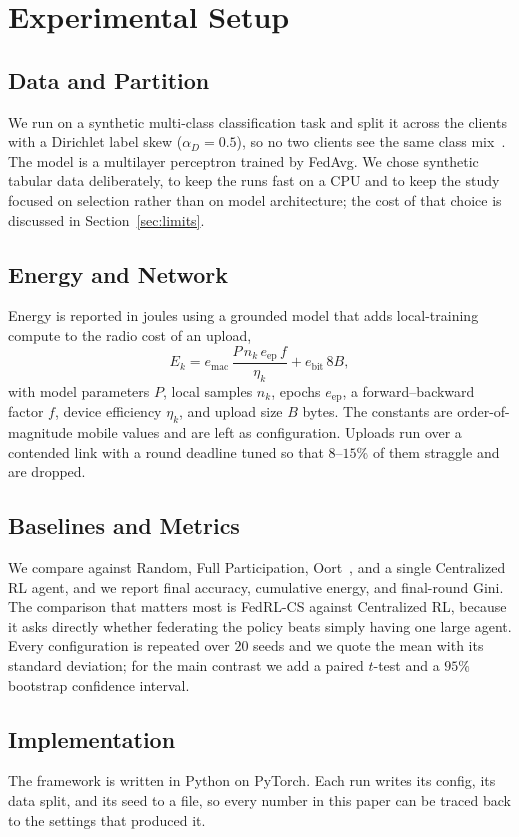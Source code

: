\documentclass[conference]{IEEEtran}
\begin{document}
\section{Experimental Setup}
\label{sec:setup}
\subsection{Data and Partition}
We run on a synthetic multi-class classification task and split it across the
clients with a Dirichlet label skew ($\alpha_D=0.5$), so no two clients see the
same class mix~\cite{hsu2019}. The model is a multilayer perceptron trained by
FedAvg. We chose synthetic tabular data deliberately, to keep the runs fast on a
CPU and to keep the study focused on selection rather than on model architecture;
the cost of that choice is discussed in Section~\ref{sec:limits}.

\subsection{Energy and Network}
Energy is reported in joules using a grounded model that adds local-training
compute to the radio cost of an upload,
\begin{equation}
E_k = e_{\text{mac}}\,\frac{P\,n_k\,e_{\text{ep}}\,f}{\eta_k} + e_{\text{bit}}\,8B,
\end{equation}
with model parameters $P$, local samples $n_k$, epochs $e_{\text{ep}}$, a
forward--backward factor $f$, device efficiency $\eta_k$, and upload size $B$
bytes. The constants are order-of-magnitude mobile values and are left as
configuration. Uploads run over a contended link with a round deadline tuned so
that $8$--$15\%$ of them straggle and are dropped.

\subsection{Baselines and Metrics}
We compare against Random, Full Participation, Oort~\cite{lai2021}, and a single
Centralized RL agent, and we report final accuracy, cumulative energy, and
final-round Gini. The comparison that matters most is FedRL-CS against Centralized
RL, because it asks directly whether federating the policy beats simply having one
large agent. Every configuration is repeated over $20$ seeds and we quote the mean
with its standard deviation; for the main contrast we add a paired $t$-test and a
$95\%$ bootstrap confidence interval.

\subsection{Implementation}
The framework is written in Python on PyTorch. Each run writes its config, its
data split, and its seed to a file, so every number in this paper can be traced
back to the settings that produced it.
\end{document}
